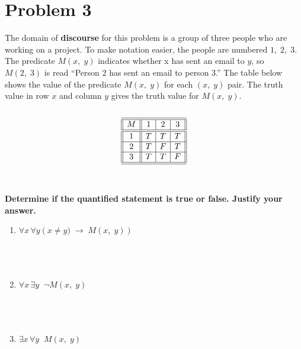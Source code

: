 \documentclass{amsart}
\theoremstyle{definition}
\theoremstyle{Exercise}
\theoremstyle{remark}
\theoremstyle{rule}
\numberwithin{equation}{section}
\begin{document}
\newpage




\section*{Problem 3}

The domain of {\bf discourse} for this problem is a group of three people who are working on a project. To make notation easier, the people are numbered $1, \;2, \;3$. The predicate $M(x,\; y)$ indicates whether x has sent an email to $y$, so $M(2, \;3)$ is read ``Person $2$ has sent an email to person $3$.'' The table below shows the value of the predicate $M(x,\;y)$ for each $(x,\;y)$ pair. The truth value in row $x$ and column $y$ gives the truth value for $M(x,\;y)$.\\\\
\[
 \begin{array}{||c||c|c|c||}
\hline\hline
M & 1 & 2& 3\\
\hline\hline
1 &T & T & T\\
\hline
2 &T & F & T\\
\hline
3 &T & T & F\\
\hline\hline
    \end{array}
    \]\\\\
{\bf Determine if the quantified statement is true or false. Justify your answer.}\\

\begin{enumerate}[label=(\alph*)]

\item $\forall x \, \forall y \left(x\not= y)\;\to \;  M(x,\;y)\right)$\\\\
\\\\

\item $\forall x \, \exists y \;\; \neg M(x,\;y)$\\\\
\\\\
\item $\exists x \, \forall y \;\; M(x,\;y)$\\\\
\\\\
\end{enumerate}
\end{document}
